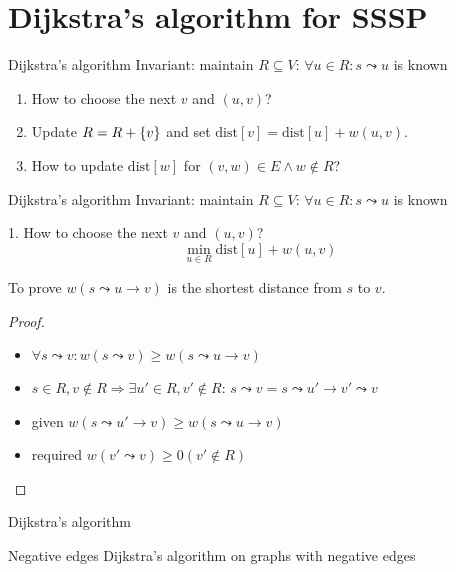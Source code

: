 \section{Dijkstra's algorithm for SSSP}

\begin{frame}{Dijkstra's algorithm}
  Invariant: maintain $R \subseteq V$: $\forall u \in R: s \leadsto u$ is known
  \begin{enumerate}
    \item How to choose the next $v$ and $(u,v)$?
    \item Update $R = R + \{v\}$ and set $\text{dist}[v] = \text{dist}[u] + w(u,v)$.
    \item How to update $\text{dist}[w]$ for $(v,w) \in E \land w \notin R$?
  \end{enumerate}
\end{frame}
\begin{frame}{Dijkstra's algorithm}
  Invariant: maintain $R \subseteq V$: $\forall u \in R: s \leadsto u$ is known
  \begin{exampleblock}{1. How to choose the next $v$ and $(u,v)$?}
    \[ \min_{u \in R} \text{dist}[u] + w(u,v) \]
  \end{exampleblock}
  
  To prove $w(s \leadsto u \to v)$ is the shortest distance from $s$ to $v$.
  \begin{proof}
    \begin{itemize}
      \item $\forall s \leadsto v: w(s \leadsto v) \ge w(s \leadsto u \to v)$
      \item $s \in R, v \notin R \Rightarrow \exists u' \in R, v' \notin R$:
	$s \leadsto v = s \leadsto u' \to v' \leadsto v$
      \item given $w(s \leadsto u' \to v) \ge w(s \leadsto u \to v)$
      \item required $w(v' \leadsto v) \ge 0 (v' \notin R)$
    \end{itemize}
  \end{proof}
\end{frame}
\begin{frame}{Dijkstra's algorithm}
  \begin{exampleblock}{Negative edges }
    Dijkstra's algorithm on graphs with negative edges
  \end{exampleblock}
\end{frame}
